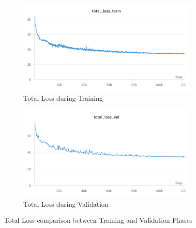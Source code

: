 \documentclass[a4paper]{article}
\begin{document}
\begin{figure}[H]
  \centering
  \begin{subfigure}{\textwidth}
    \centering
    \includegraphics[width=\linewidth]{total-loss-train.png}
    \caption{Total Loss during Training}
    \label{fig:total-loss-train}
  \end{subfigure}
  \hfill
  \begin{subfigure}{\textwidth}
    \centering
    \includegraphics[width=\linewidth]{total-loss-val.png}
    \caption{Total Loss during Validation}
    \label{fig:total-loss-val}
  \end{subfigure}
  \caption{Total Loss comparison between Training and Validation Phases}
\end{figure}
\end{document}
